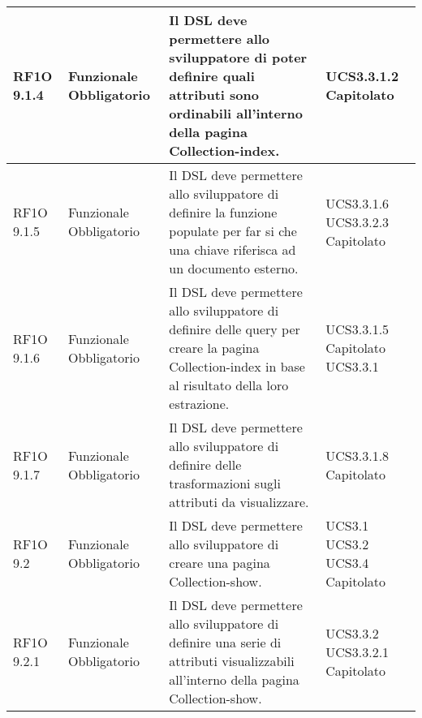 \begin{center}
\begin{longtable}{ | l | p{2cm} | p{5cm} | p{1.7cm} |}
        RF1O 9.1.4  & Funzionale \newline  Obbligatorio  & Il DSL deve permettere allo sviluppatore di poter definire quali attributi sono ordinabili all'interno della pagina Collection-index.
 &  UCS3.3.1.2 \newline  Capitolato \newline  \\ \hline      
        RF1O 9.1.5 & Funzionale \newline  Obbligatorio  & Il DSL deve permettere allo sviluppatore di definire la funzione populate per far si che una chiave riferisca ad un documento esterno.
 &  UCS3.3.1.6 \newline  UCS3.3.2.3 \newline  Capitolato \newline  \\ \hline      
        RF1O 9.1.6 & Funzionale \newline  Obbligatorio  & Il DSL deve permettere allo sviluppatore di definire delle query per creare la pagina Collection-index in base al risultato della loro estrazione.
 &  UCS3.3.1.5 \newline  Capitolato \newline  UCS3.3.1 \newline  \\ \hline      
        RF1O 9.1.7 & Funzionale \newline  Obbligatorio  & Il DSL deve permettere allo sviluppatore di definire delle trasformazioni sugli attributi da visualizzare. &  UCS3.3.1.8 \newline  Capitolato \newline  \\ \hline      
        RF1O 9.2 & Funzionale \newline  Obbligatorio  & Il DSL deve permettere allo sviluppatore di creare una pagina Collection-show. &  UCS3.1 \newline  UCS3.2 \newline  UCS3.4 \newline  Capitolato \newline  \\ \hline      
        RF1O 9.2.1  & Funzionale \newline  Obbligatorio  & Il DSL deve permettere allo sviluppatore di definire una serie di attributi visualizzabili all'interno della pagina Collection-show.
 &  UCS3.3.2 \newline  UCS3.3.2.1 \newline  Capitolato \newline  \\ \hline      

\end{longtable}
\end{center}
